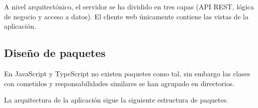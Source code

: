 A nivel arquitectónico, el servidor se ha dividido en tres capas (API REST, lógica de negocio y acceso a datos). El cliente web únicamente contiene las vistas de la aplicación.


\subsection{Diseño de paquetes}

En JavaScript y TypeScript no existen paquetes como tal, sin embargo las clases con cometidos y responsabilidades similares se han agrupado en directorios. 

La arquitectura de la aplicación sigue la siguiente estructura de paquetes.

